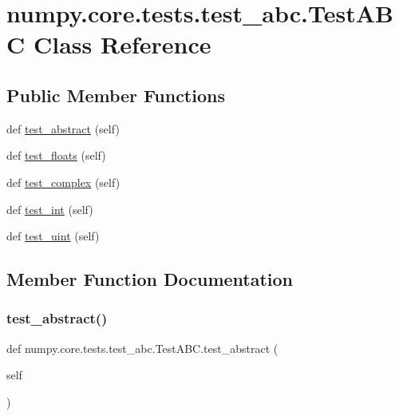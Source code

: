 \hypertarget{classnumpy_1_1core_1_1tests_1_1test__abc_1_1TestABC}{}\section{numpy.\+core.\+tests.\+test\+\_\+abc.\+Test\+A\+BC Class Reference}
\label{classnumpy_1_1core_1_1tests_1_1test__abc_1_1TestABC}
\subsection*{Public Member Functions}
\begin{DoxyCompactItemize}
\item 
def \hyperlink{classnumpy_1_1core_1_1tests_1_1test__abc_1_1TestABC_a93eb926fc02d3addd6a5828c21fb871e}{test\+\_\+abstract} (self)
\item 
def \hyperlink{classnumpy_1_1core_1_1tests_1_1test__abc_1_1TestABC_a98286e36e75e05e1d60f5a1f7ee61459}{test\+\_\+floats} (self)
\item 
def \hyperlink{classnumpy_1_1core_1_1tests_1_1test__abc_1_1TestABC_a8fb94c1e240baf3258ca161dde939720}{test\+\_\+complex} (self)
\item 
def \hyperlink{classnumpy_1_1core_1_1tests_1_1test__abc_1_1TestABC_ac1b174d95454f026f6d55982e13e8478}{test\+\_\+int} (self)
\item 
def \hyperlink{classnumpy_1_1core_1_1tests_1_1test__abc_1_1TestABC_adfea59a93223771a2125c23095f6d55a}{test\+\_\+uint} (self)
\end{DoxyCompactItemize}


\subsection{Member Function Documentation}
\mbox{\label{classnumpy_1_1core_1_1tests_1_1test__abc_1_1TestABC_a93eb926fc02d3addd6a5828c21fb871e}} 
\subsubsection{\texorpdfstring{test\+\_\+abstract()}{test\_abstract()}}
{\footnotesize\ttfamily def numpy.\+core.\+tests.\+test\+\_\+abc.\+Test\+A\+B\+C.\+test\+\_\+abstract (\begin{DoxyParamCaption}\item[{}]{self }\end{DoxyParamCaption})}

